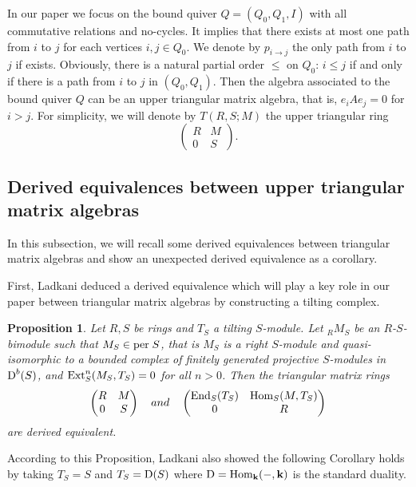 \documentclass[a4paper, reqno]{amsart}
\newtheorem{prop}[thm]{Proposition}
\theoremstyle{definition}
\theoremstyle{remark}
\numberwithin{equation}{section}
\begin{document}
In our paper we focus on the bound quiver $Q=(Q_0,Q_1,I)$ with all commutative relations and no-cycles. It implies that there exists at most one path from $i$ to $j$ for each vertices $i,j\in Q_0$. We denote by $p_{i\to j}$ the only path from $i$ to $j$ if exists. Obviously, there is a natural partial order $\leq$ on $Q_0$: $i\leq j$ if and only if there is a path from $i$ to $j$ in $(Q_0,Q_1)$. Then the algebra associated to the bound quiver $Q$ can be an upper triangular matrix algebra, that is, $e_iAe_j=0$ for $i>j$. For simplicity, we will denote by $T(R,S;M)$ the upper triangular ring
$$\begin{pmatrix}
R  & M\\
0  & S
\end{pmatrix}.$$

\subsection{Derived equivalences between upper triangular matrix algebras}
In this subsection, we will recall some derived equivalences between triangular matrix algebras and show an unexpected derived equivalence as a corollary. 

First, Ladkani \cite{Lad2011} deduced a derived equivalence which will play a key role in our paper between triangular matrix algebras by constructing a tilting complex. 

\begin{prop} \textup{\cite[Theorem 4.5]{Lad2011}} \label{TiltingMod}
Let $R,S$ be rings and $T_S$ a tilting $S$-module. Let ${_R}M_S$ be an $R$-$S$-bimodule such that $M_S\in\textup{per}\;S$, that is $M_S$ is a right $S$-module and quasi-isomorphic to a bounded complex of finitely generated projective $S$-modules in $\textup{D}^{b}(S)$, and $\textup{Ext}^n_S(M_S,T_S)=0$ for all $n>0$.
Then the triangular matrix rings 
$$\begin{pmatrix}
R  & M\\
0  & S
\end{pmatrix}\,\,\,\,\,\,
and\,\,\,\,\,\,
\begin{pmatrix}
\textup{End}_{S}(T_S)  & \textup{Hom}{_S(M,T_S)}\\  
0  & R      
\end{pmatrix}$$are derived equivalent. 
\end{prop}

According to this Proposition, Ladkani also showed the following Corollary holds by taking $T_S=S$ and $T_S=\textup{D}(S)$ where $\textup{D}=\textup{Hom}_{\bf k} ({-}, {\bf k})$ is the standard duality.
\end{document}
